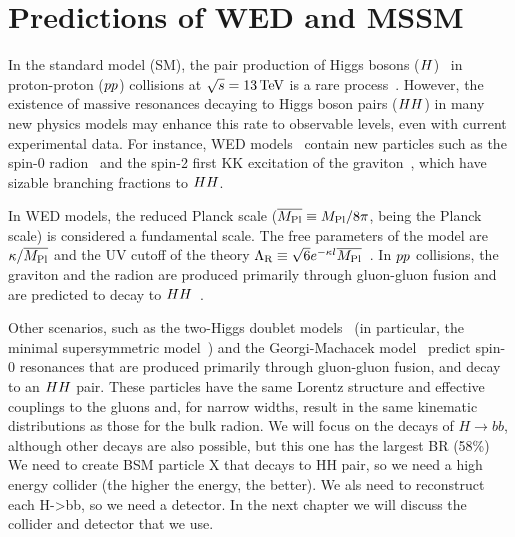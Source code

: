 \section{Predictions of WED and MSSM}
In the standard model (SM), the pair production of Higgs bosons ($H$)~\cite{HiggsDiscoveryAtlas,HiggsDiscoveryCMS,CMSHiggsLongPaper} in proton-proton ($pp$) collisions at $\sqrt{s} = 13\,\text{Te\hspace{-.08em}V}$ is a rare process~\cite{deFlorian:2013jea}.
However, the existence of massive resonances decaying to Higgs boson pairs ($HH$) in many new physics models may enhance this rate to observable levels, even with current experimental data.
For instance, WED models~\cite{Randall:1999ee} contain new particles such as the spin-0 radion~\cite{Goldberger:1999uk,Csaki:1999mp,Csaki:2000zn} and the spin-2 first KK excitation of the graviton~\cite{Davoudiasl:1999jd,DeWolfe:1999cp, Agashe:2007zd}, which have sizable branching fractions to $HH$.

In WED models, the reduced Planck scale ($\overline{{M_\mathrm{Pl}}} \equiv {M_\mathrm{Pl}}/8\pi$, \Mpl being the Planck scale) is considered a fundamental scale.
The free parameters of the model are $\kappa / \overline{{M_\mathrm{Pl}}}$ and the UV cutoff of the theory $\Lambda_{\textrm R} \equiv \sqrt{6} e^{-\kappa l} \overline{{M_\mathrm{Pl}}}$~\cite{Goldberger:1999uk}.
In $pp$ collisions, the graviton and the radion are produced primarily through gluon-gluon fusion and are predicted to decay to $HH$~\cite{Oliveira:2014kla}.

Other scenarios, such as the two-Higgs doublet models~\cite{Branco:2011iw} (in particular, the minimal supersymmetric model~\cite{Djouadi:2005gj}) and the Georgi-Machacek model~\cite{GEORGI1985463} predict spin-0 resonances that are produced primarily through gluon-gluon fusion, and decay to an $HH$ pair.
These particles have the same Lorentz structure and effective couplings to the gluons and, for narrow widths, result in the same kinematic distributions as those for the bulk radion. 
We will focus on the decays of $H \rightarrow bb$, although other decays are also possible, but this one has the largest BR (58\%)
We need to create BSM particle X that decays to HH pair, so we need a high energy collider (the higher the energy, the better).  We als need to reconstruct each H->bb, so we need a detector.
In the next chapter we will discuss the collider and detector that we use.

